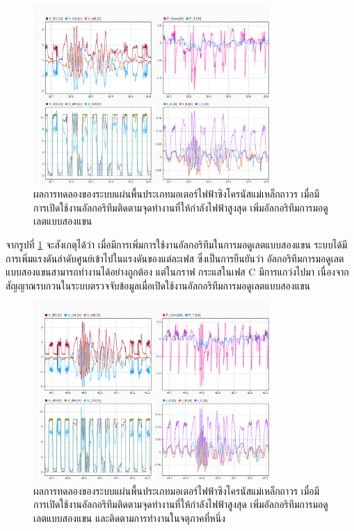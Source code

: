 \documentclass[11pt,a4paper]{article}
\begin{document}
\begin{figure}[H]
    \centering
    \includegraphics[width=0.8\textwidth]{dc-results/ac-inv-no-fqt.png}
    \caption{ผลการทดลองของระบบแผ่นพื้นประเภทมอเตอร์ไฟฟ้าซิงโครนัสแม่เหล็กถาวร เมื่อมีการเปิดใช้งานอัลกอริทึมติดตามจุดทำงานที่ให้กำลังไฟฟ้าสูงสุด เพิ่มอัลกอริทึมการมอดูเลตแบบสองแขน}
    \label{ac-inv-no-fqt}
\end{figure}

จากรูปที่ \ref{ac-inv-no-fqt} จะสังเกตุได้ว่า เมื่อมีการเพิ่มการใช้งานอัลกอริทึมในการมอดูเลตแบบสองแขน ระบบได้มีการเพิ่มแรงดันลำดับศูนย์เข้าไปในแรงดันของแต่ละเฟส ซึ่งเป็นการยืนยันว่า อัลกอริทึมการมอดูเลตแบบสองแขนสามารถทำงานได้อย่างถูกต้อง แต่ในกราฟ กระแสในเฟส C มีการแกว่งไปมา เนื่องจากสัญญาณรบกวนในระบบตรวจจับข้อมูลเมื่อเปิดใช้งานอัลกอริทึมการมอดูเลตแบบสองแขน

\begin{figure}[H]
    \centering
    \includegraphics[width=0.8\textwidth]{dc-results/ac-inv-fqt.png}
    \caption{ผลการทดลองของระบบแผ่นพื้นประเภทมอเตอร์ไฟฟ้าซิงโครนัสแม่เหล็กถาวร เมื่อมีการเปิดใช้งานอัลกอริทึมติดตามจุดทำงานที่ให้กำลังไฟฟ้าสูงสุด เพิ่มอัลกอริทึมการมอดูเลตแบบสองแขน และติดตามการทำงานในจตุภาคที่หนึ่ง}
    \label{ac-inv-fqt}
\end{figure}
\end{document}
